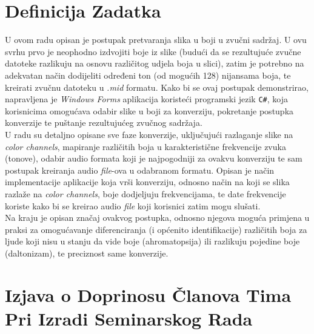 \documentclass[12pt,a4paper]{article}
\begin{document}


\section*{Definicija Zadatka}

U ovom radu opisan je postupak pretvaranja slika u boji u zvučni sadržaj. U ovu svrhu prvo je neophodno izdvojiti boje iz slike (budući da se rezultujuće zvučne datoteke razlikuju na osnovu različitog udjela boja u slici), zatim je potrebno na adekvatan način dodijeliti određeni ton (od mogućih 128) nijansama boja, te kreirati zvučnu datoteku u \textit{.mid} formatu. Kako bi se ovaj postupak demonstrirao, napravljena je \textit{Windows Forms} aplikacija koristeći programski jezik \texttt{C\#}, koja korisnicima omogućava odabir slike u boji za konverziju, pokretanje postupka konverzije te puštanje rezultujućeg zvučnog sadržaja. \\

U radu su detaljno opisane sve faze konverzije, uključujući razlaganje slike na \textit{color channels}, mapiranje različitih boja u karakteristične frekvencije zvuka (tonove), odabir audio formata koji je najpogodniji za ovakvu konverziju te sam postupak kreiranja audio \textit{file}-ova u odabranom formatu. Opisan je način implementacije aplikacije koja vrši konverziju, odnosno način na koji se slika razlaže na \textit{color channels}, boje dodjeljuju frekvencijama, te date frekvencije koriste kako bi se kreirao audio \textit{file} koji korisnici zatim mogu slušati. \\

Na kraju je opisan značaj ovakvog postupka, odnosno njegova moguća primjena u praksi za omogućavanje diferenciranja (i općenito identifikacije) različitih boja za ljude koji nisu u stanju da vide boje (ahromatopsija) ili razlikuju pojedine boje (daltonizam), te preciznost same konverzije.

\newpage

\section*{Izjava o Doprinosu Članova Tima Pri Izradi Seminarskog Rada}
\end{document}
